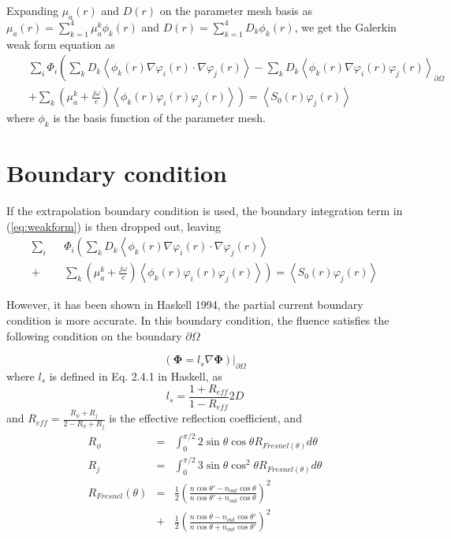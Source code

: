 \documentclass[12pt]{book}               %
\begin{document}
Expanding $\mu_a(r)$ and $D(r)$ on the parameter mesh basis as
$\mu_a(r)=\sum_{k=1}^{4}\mu_a^k\phi_k(r)$ and
$D(r)=\sum_{k=1}^{4}D_k\phi_k(r)$, we get the Galerkin weak form
equation as
\begin{eqnarray}
\label{eq:weakform}\nonumber&&\sum_{i}\Phi_i\left(\sum_{k}D_k\left\langle
\phi_k(r)\nabla\varphi_i(r)\cdot\nabla\varphi_j(r)\right\rangle -
\sum_{k}D_k\left\langle
\phi_k(r)\nabla\varphi_i(r)\varphi_j(r)\right\rangle_{\partial\Omega}\right.
\\&&\left.+\sum_{k}\left(\mu_{a}^k+\frac{j\omega}{c}\right)\left\langle\phi_k(r)\varphi_i(r)\varphi_j(r)\right\rangle\right)=\left\langle
S_0(r)\varphi_j(r)\right\rangle
\end{eqnarray}
where $\phi_k$ is the basis function of the parameter mesh.

\section{Boundary condition}

If the extrapolation boundary condition is used, the boundary
integration term in (\ref{eq:weakform}) is then dropped out,
leaving
\begin{eqnarray}
\label{eq:weakformzerobd}\sum_{i}&&\Phi_i\left(\sum_{k}D_k\left\langle
\phi_k(r)\nabla\varphi_i(r)\cdot\nabla\varphi_j(r)\right\rangle\right.\\\nonumber
+&&\left.\sum_{k}\left(\mu_{a}^k+\frac{j\omega}{c}\right)\left\langle\phi_k(r)\varphi_i(r)\varphi_j(r)\right\rangle\right)=\left\langle
S_0(r)\varphi_j(r)\right\rangle
\end{eqnarray}

However, it has been shown in Haskell 1994, the partial current boundary
condition is more accurate. In this boundary condition, the fluence
satisfies the following condition on the boundary $\partial\Omega$

\begin{equation}
\label{eq:partialcurrent} \left(\boldsymbol\Phi=l_s\nabla{\boldsymbol\Phi}\right)|_{\partial\Omega}
\end{equation}
where $l_s$ is defined in Eq. 2.4.1 in Haskell, as
\begin{equation}
l_s=\frac{1+R_{eff}}{1-R_{eff}}2D
\end{equation}
and $R_{eff}=\frac{R_\phi+R_j}{2-R_\phi+R_j}$ is the effective reflection coefficient, and 
\begin{eqnarray}
R_\phi &=& \int_0^{\pi/2}2\sin \theta \cos\theta R_{Fresnel(\theta)}d\theta\\
R_j &=& \int_0^{\pi/2}3\sin \theta \cos^2\theta R_{Fresnel(\theta)}d\theta \\
R_{Fresnel}(\theta) &=& \frac{1}{2}\left(\frac{n \cos\theta' - n_{out} \cos\theta}{n \cos\theta' + n_{out} \cos\theta}\right)^2 \\
   &+&\frac{1}{2}\left(\frac{n \cos\theta - n_{out} \cos\theta'}{n \cos\theta + n_{out} \cos\theta'}\right)^2
\end{eqnarray}
\end{document}
